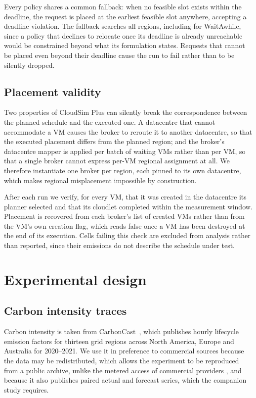 Every policy shares a common fallback: when no feasible slot exists within the
deadline, the request is placed at the earliest feasible slot anywhere,
accepting a deadline violation. The fallback searches all regions, including for
WaitAwhile, since a policy that declines to relocate once its deadline is
already unreachable would be constrained beyond what its formulation states.
Requests that cannot be placed even beyond their deadline cause the run to
fail rather than to be silently dropped.

\subsection{Placement validity}
\label{sec:validity}

Two properties of CloudSim Plus can silently break the correspondence between
the planned schedule and the executed one. A datacentre that cannot
accommodate a VM causes the broker to reroute it to another datacentre, so that
the executed placement differs from the planned region; and the broker's
datacentre mapper is applied per batch of waiting VMs rather than per VM, so
that a single broker cannot express per-VM regional assignment at all. We
therefore instantiate one broker per region, each pinned to its own datacentre,
which makes regional misplacement impossible by construction.

After each run we verify, for every VM, that it was created in the datacentre
its planner selected and that its cloudlet completed within the measurement
window. Placement is recovered from each broker's list of created VMs rather
than from the VM's own creation flag, which reads false once a VM has been
destroyed at the end of its execution. Cells failing this check are excluded
from analysis rather than reported, since their emissions do not describe the
schedule under test.

\section{Experimental design}
\label{sec:design}

\subsection{Carbon intensity traces}

Carbon intensity is taken from CarbonCast~\cite{maji2022carboncast}, which publishes
hourly lifecycle emission factors for thirteen grid regions across North America, Europe and
Australia for 2020--2021. We use it in preference to commercial sources because
the data may be redistributed, which allows the experiment to be reproduced
from a public archive, unlike the metered access of commercial providers
\cite{electricitymaps}, and because it also publishes paired actual and
forecast series, which the companion study requires.

